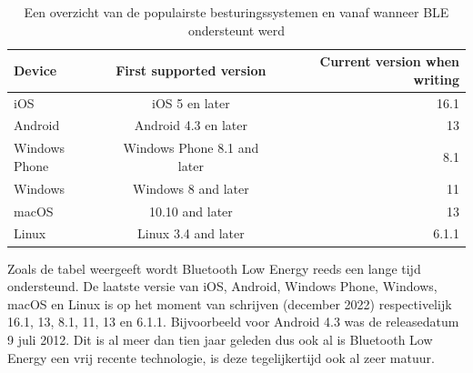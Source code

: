 \begin{table}
    \begin{tabular}{l | c | r}
        \hline
        Device & First supported version & Current version when writing\\
        \hline
        iOS & iOS 5 en later & 16.1 \\
        Android & Android 4.3 en later & 13 \\
        Windows Phone & Windows Phone 8.1 and later & 8.1\\
        Windows & Windows 8 and later & 11\\
        macOS & 10.10 and later & 13 \\
        Linux & Linux 3.4 and later & 6.1.1 \\
    \end{tabular}
    \caption{Een overzicht van de populairste besturingssystemen en vanaf wanneer BLE ondersteunt werd}
    \label{tab:os}
\end{table}

Zoals de tabel weergeeft wordt Bluetooth Low Energy reeds een lange tijd ondersteund. De laatste versie van iOS, Android, Windows Phone, Windows, macOS en Linux is op het moment van schrijven (december 2022) respectivelijk 16.1, 13, 8.1, 11, 13 en 6.1.1. Bijvoorbeeld voor Android 4.3 was de releasedatum 9 juli 2012. Dit is al meer dan tien jaar geleden dus ook al is Bluetooth Low Energy een vrij recente technologie, is deze tegelijkertijd ook al zeer matuur.

